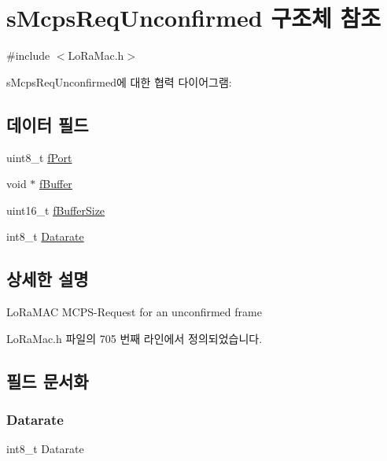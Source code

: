 \hypertarget{structs_mcps_req_unconfirmed}{}\section{s\+Mcps\+Req\+Unconfirmed 구조체 참조}
\label{structs_mcps_req_unconfirmed}


{\ttfamily \#include $<$Lo\+Ra\+Mac.\+h$>$}



s\+Mcps\+Req\+Unconfirmed에 대한 협력 다이어그램\+:
\subsection*{데이터 필드}
\begin{DoxyCompactItemize}
\item 
uint8\+\_\+t \mbox{\hyperlink{structs_mcps_req_unconfirmed_a2973de9ac0ab5e876b80362bc4c6a88b}{f\+Port}}
\item 
void $\ast$ \mbox{\hyperlink{structs_mcps_req_unconfirmed_a2e9f11cf5a8f2a797999359bedee31af}{f\+Buffer}}
\item 
uint16\+\_\+t \mbox{\hyperlink{structs_mcps_req_unconfirmed_a6b4fc83528d7391a193516d9f4ba985b}{f\+Buffer\+Size}}
\item 
int8\+\_\+t \mbox{\hyperlink{structs_mcps_req_unconfirmed_ae2f6080f3aa0e9485c55513ca56bb24d}{Datarate}}
\end{DoxyCompactItemize}


\subsection{상세한 설명}
Lo\+Ra\+M\+AC M\+C\+P\+S-\/\+Request for an unconfirmed frame 

Lo\+Ra\+Mac.\+h 파일의 705 번째 라인에서 정의되었습니다.



\subsection{필드 문서화}
\mbox{\label{structs_mcps_req_unconfirmed_ae2f6080f3aa0e9485c55513ca56bb24d}} 
\subsubsection{\texorpdfstring{Datarate}{Datarate}}
{\footnotesize\ttfamily int8\+\_\+t Datarate}

